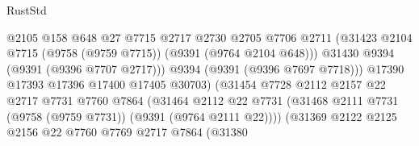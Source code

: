 \begin{lexlean}{RustStd}
\begin{coremodule}
                                          @2105
                                          @158
                                          @648
                                          @27
                                          @7715
                                          @2717
                                          @2730
                                          @2705
                                          @7706
                                          @2711
                                          (@31423
                                            @2104
                                            @7715
                                            (@9758 (@9759 @7715))
                                            (@9391 (@9764 @2104 @648)))
                                          @31430
                                          @9394
                                          (@9391 (@9396 @7707 @2717)))
                                        @9394
                                        (@9391 (@9396 @7697 @7718)))
                                      @17390
                                      @17393
                                      @17396
                                      @17400
                                      @17405
                                      @30703)
                                    (@31454
                                      @7728
                                      @2112
                                      @2157
                                      @22
                                      @2717
                                      @7731
                                      @7760
                                      @7864
                                      (@31464
                                        @2112
                                        @22
                                        @7731
                                        (@31468
                                          @2111
                                          @7731
                                          (@9758 (@9759 @7731))
                                          (@9391 (@9764 @2111 @22))))
                                      (@31369
                                        @2122
                                        @2125
                                        @2156
                                        @22
                                        @7760
                                        @7769
                                        @2717
                                        @7864
                                        (@31380

\end{coremodule}
\end{lexlean}
